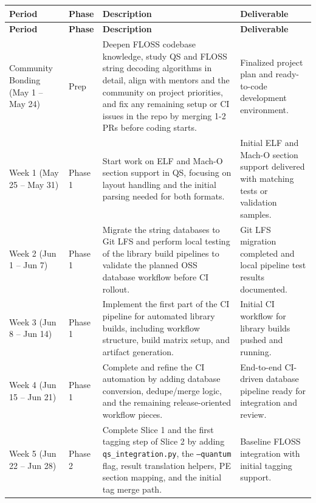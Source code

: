 \documentclass[12pt]{article}
\begin{document}
\renewcommand{\arraystretch}{1.25}
{\scriptsize
\begin{longtable}{|>{\centering\arraybackslash}m{1.45in}|>{\centering\arraybackslash}m{0.95in}|>{\raggedright\arraybackslash}m{2.55in}|>{\raggedright\arraybackslash}m{1.05in}|}
\hline
\textbf{Period} & \textbf{Phase} & \textbf{Description} & \textbf{Deliverable} \\
\hline
\endfirsthead
\hline
\textbf{Period} & \textbf{Phase} & \textbf{Description} & \textbf{Deliverable} \\
\hline
\endhead
Community Bonding ~ ~ (May 1 -- May 24) & Prep & Deepen FLOSS codebase knowledge, study QS and FLOSS string decoding algorithms in detail, align with mentors and the community on project priorities, and fix any remaining setup or CI issues in the repo by merging 1-2 PRs before coding starts. & Finalized project plan and ready-to-code development environment. \\
\hline
\rowcolor{ForestGreen!10}
Week 1 (May 25 -- May 31) & Phase 1 & Start work on ELF and Mach-O section support in QS, focusing on layout handling and the initial parsing needed for both formats. & Initial ELF and Mach-O section support delivered with matching tests or validation samples. \\
\hline
\rowcolor{ForestGreen!10}
Week 2 (Jun 1 -- Jun 7) & Phase 1 & Migrate the string databases to Git LFS and perform local testing of the library build pipelines to validate the planned OSS database workflow before CI rollout. & Git LFS migration completed and local pipeline test results documented. \\
\hline
\rowcolor{ForestGreen!10}
Week 3 (Jun 8 -- Jun 14) & Phase 1 & Implement the first part of the CI pipeline for automated library builds, including workflow structure, build matrix setup, and artifact generation. & Initial CI workflow for library builds pushed and running. \\
\hline
\rowcolor{ForestGreen!10}
Week 4 (Jun 15 -- Jun 21) & Phase 1 & Complete and refine the CI automation by adding database conversion, dedupe/merge logic, and the remaining release-oriented workflow pieces. & End-to-end CI-driven database pipeline ready for integration and review. \\
\hline
\rowcolor{Cerulean!10}
Week 5 (Jun 22 -- Jun 28) & Phase 2 & Complete Slice 1 and the first tagging step of Slice 2 by adding \texttt{qs\_integration.py}, the \texttt{--quantum} flag, result translation helpers, PE section mapping, and the initial tag merge path. & Baseline FLOSS integration with initial tagging support. \\

\end{longtable}}
\end{document}
